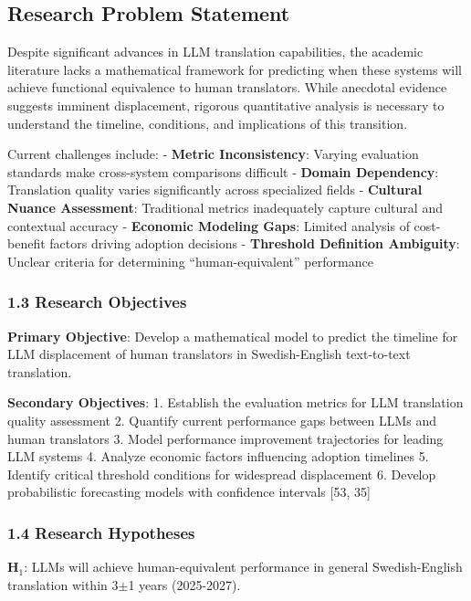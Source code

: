 \documentclass[12pt,a4paper]{article}
\begin{document}
\subsection{Research Problem Statement}

Despite significant advances in LLM translation capabilities, the
academic literature lacks a mathematical framework for predicting when
these systems will achieve functional equivalence to human translators.
While anecdotal evidence suggests imminent displacement, rigorous
quantitative analysis is necessary to understand the timeline,
conditions, and implications of this transition.

Current challenges include: - \textbf{Metric Inconsistency}: Varying
evaluation standards make cross-system comparisons difficult -
\textbf{Domain Dependency}: Translation quality varies significantly
across specialized fields - \textbf{Cultural Nuance Assessment}:
Traditional metrics inadequately capture cultural and contextual
accuracy - \textbf{Economic Modeling Gaps}: Limited analysis of
cost-benefit factors driving adoption decisions - \textbf{Threshold
Definition Ambiguity}: Unclear criteria for determining
``human-equivalent'' performance

\hypertarget{research-objectives}{%
\subsubsection{1.3 Research Objectives}\label{research-objectives}}

\textbf{Primary Objective}: Develop a mathematical model to predict the
timeline for LLM displacement of human translators in Swedish-English
text-to-text translation.

\textbf{Secondary Objectives}: 1. Establish the evaluation metrics for
LLM translation quality assessment 2. Quantify current performance gaps
between LLMs and human translators 3. Model performance improvement
trajectories for leading LLM systems 4. Analyze economic factors
influencing adoption timelines 5. Identify critical threshold conditions
for widespread displacement 6. Develop probabilistic forecasting models
with confidence intervals {[}53, 35{]}

\hypertarget{research-hypotheses}{%
\subsubsection{1.4 Research Hypotheses}\label{research-hypotheses}}

\textbf{H$_1$}: LLMs will achieve human-equivalent performance in general
Swedish-English translation within 3$\pm$1 years (2025-2027).
\end{document}
